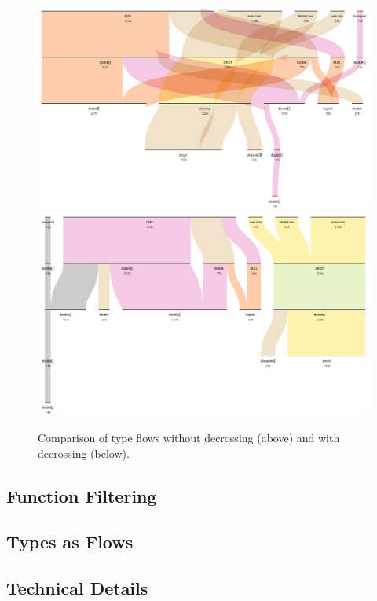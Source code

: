 \documentclass{vgtc}                          %
\begin{document}
\begin{figure}[tb]
 \centering
 \includegraphics[width=\columnwidth]{img/no_decross.png}
 \includegraphics[width=\columnwidth]{img/decross.png}
 \caption{Comparison of type flows without decrossing (above) and with decrossing (below).}
 \label{fig:decross}
\end{figure}


\subsection{Function Filtering}

\subsection{Types as Flows}

\subsection{Technical Details}
\end{document}
